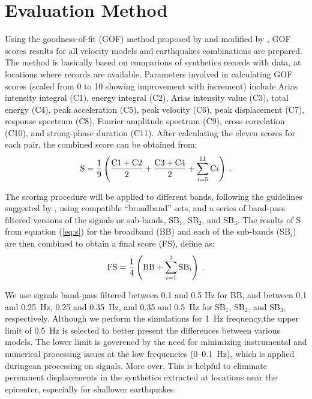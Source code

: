 
\section{Evaluation Method}

Using the goodness-of-fit (GOF) method proposed by \citet{Anderson_2004_Proc} and modified by \citet{Taborda_2013_BSSA}, GOF scores results for all velocity models and earthquakes combinations are prepared. The method is basically based on comparions of synthetics records with data, at locations where records are available. Parameters involved in calculating GOF scores (scaled from 0 to 10 showing improvement with increment) include Arias intensity integral (C1), energy integral (C2), Arias intensity value (C3), total energy (C4), peak acceleration (C5), peak velocity (C6), peak displacement (C7), response spectrum (C8), Fourier amplitude spectrum (C9), cross correlation (C10), and strong-phase duration (C11). After calculating the eleven scores for each pair, the combined score can be obtained from: 
%
\begin{equation}
	\mathrm{S} = \frac{1}{9} \left( 
		\frac{\mathrm{C}1+\mathrm{C}2}{2} +
		\frac{\mathrm{C}3+\mathrm{C}4}{2} +
		\sum_{i=5}^{11} \mathrm{C}i
	\right)
	\hspace{0.25em}.
	\label{eq:s}
\end{equation}

The scoring procedure will be applied to different bands, following the guidelines suggested by \citet{Anderson_2004_Proc}, using compatible ``broadband'' sets, and a series of band-pass filtered versions of the signals or sub-bands, SB$_1$, SB$_2$, and SB$_3$. The results of S from equation (\ref{eq:s}) for the broadband (BB) and each of the sub-bands (SB$_i$) are then combined to obtain a final score (FS), define as:
%
\begin{equation}
	\mathrm{FS} = \frac{1}{4} \left( \mathrm{BB} + \sum^3_{i=1} \mathrm{SB}_i \right)
	\hspace{0.25em}.
	\label{eq:fs}
\end{equation}

We use signals band-pass filtered between 0.1 and 0.5 Hz for BB, and between 0.1 and 0.25~Hz, 0.25 and 0.35~Hz, and 0.35 and 0.5~Hz for SB$_1$, SB$_2$, and SB$_3$, respectively. Although we perform the simulations for 1~Hz frequency,the upper limit of 0.5~Hz is selected to better present the differences between various models. The lower limit is goverened by the need for minimizing instrumental and numerical processing issues at the low frequencies (0--0.1~Hz), which is applied duringcan processing on signals. More over, This is helpful to eliminate permanent displacements in the synthetics extracted at locations near the epicenter, especially for shallower earthquakes. 


